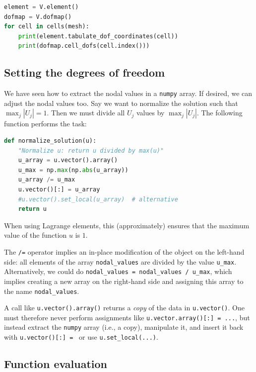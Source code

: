 \documentclass[graybox,envcountchap,sectrefs,final]{svmonodo}
\newenvironment{warning_mdfboxadmon}[1][]{
\begin{warning_mdfboxmdframed}[frametitle=#1]
}
{
\end{warning_mdfboxmdframed}
}
\begin{document}
\begin{lstlisting}[language=Python,style=graycolor]
element = V.element()
dofmap = V.dofmap()
for cell in cells(mesh):
    print(element.tabulate_dof_coordinates(cell))
    print(dofmap.cell_dofs(cell.index()))
\end{lstlisting}

\subsection{Setting the degrees of freedom}

We have seen how to extract the nodal values in a \texttt{numpy} array.
If desired, we can adjust the nodal values too. Say we want to
normalize the solution such that $\max_j |U_j| = 1$. Then we
must divide all $U_j$ values
by $\max_j |U_j|$. The following function performs the task:

\begin{lstlisting}[language=Python,style=graycolor]
def normalize_solution(u):
    "Normalize u: return u divided by max(u)"
    u_array = u.vector().array()
    u_max = np.max(np.abs(u_array))
    u_array /= u_max
    u.vector()[:] = u_array
    #u.vector().set_local(u_array)  # alternative
    return u
\end{lstlisting}
When using Lagrange elements, this (approximately) ensures that the
maximum value of the function $u$ is $1$.

The \texttt{/=} operator implies an
in-place modification of the object on the left-hand side: all
elements of the array \Verb!nodal_values! are divided by the value \Verb!u_max!.
Alternatively, we could do \Verb!nodal_values = nodal_values / u_max!, which
implies creating a new array on the right-hand side and assigning this
array to the name \Verb!nodal_values!.


\begin{warning_mdfboxadmon}
A call like \texttt{u.vector().array()} returns a \emph{copy} of the data in
\texttt{u.vector()}. One must therefore never perform assignments like
\texttt{u.vector.array()[:] = ...}, but instead extract the \texttt{numpy} array
(i.e., a copy), manipulate it, and insert it back with \texttt{u.vector()[:] = } or use \Verb!u.set_local(...)!.
\end{warning_mdfboxadmon} %

\subsection{Function evaluation}
\end{document}
